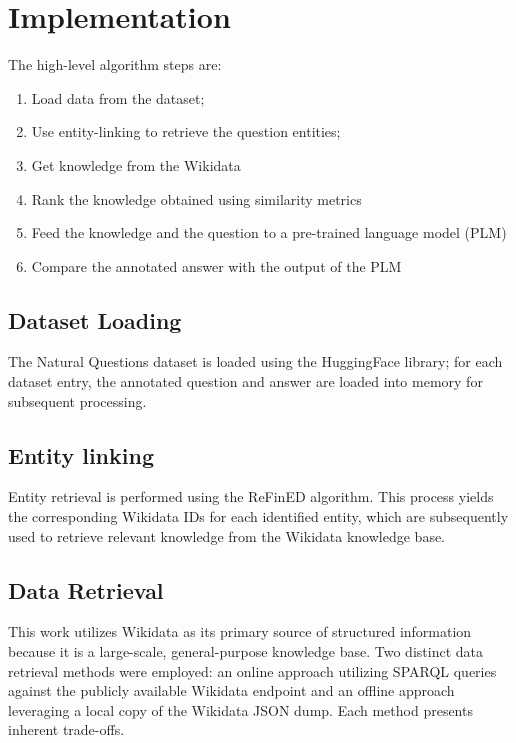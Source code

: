 \documentclass{article}
\begin{document}
\section{Implementation}

The high-level algorithm steps are:
\begin{enumerate}
    \item Load data from the dataset;
    \item Use entity-linking to retrieve the question entities;
    \item Get knowledge from the Wikidata
    \item Rank the knowledge obtained using similarity metrics
    \item Feed the knowledge and the question to a pre-trained language model (PLM)
    \item Compare the annotated answer with the output of the PLM
\end{enumerate}

\subsection{Dataset Loading}

The Natural Questions dataset is loaded using the HuggingFace library; for each dataset entry, the annotated question and answer are loaded into memory for subsequent processing.

\subsection{Entity linking}

Entity retrieval is performed using the ReFinED algorithm\cite{ayoola-etal-2022-refined}. This process yields the corresponding Wikidata IDs for each identified entity, which are subsequently used to retrieve relevant knowledge from the Wikidata knowledge base.


\subsection{Data Retrieval} \label{data-retrieval}

This work utilizes Wikidata as its primary source of structured information because it is a large-scale, general-purpose knowledge base. Two distinct data retrieval methods were employed: an online approach utilizing SPARQL queries against the publicly available Wikidata endpoint and an offline approach leveraging a local copy of the Wikidata JSON dump. Each method presents inherent trade-offs.
\end{document}
